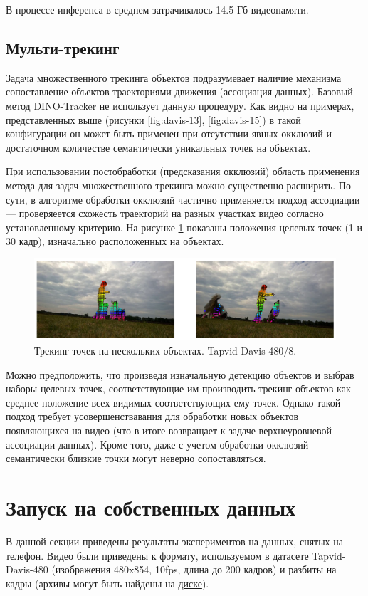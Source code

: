 \documentclass[a4paper, 14pt]{extarticle}
\theoremstyle{definition}
\theoremstyle{plain}
\theoremstyle{remark}
\begin{document}
В процессе инференса в среднем затрачивалось 14.5 Гб видеопамяти.

\subsection{Мульти-трекинг}
Задача множественного трекинга объектов подразумевает наличие механизма сопоставление объектов траекториями движения (ассоциация данных). Базовый метод DINO-Tracker не использует данную процедуру. Как видно на примерах, представленных выше (рисунки \ref{fig:davis-13}, \ref{fig:davis-15}) в такой конфигурации он может быть применен при отсутствии явных окклюзий и достаточном количестве семантически уникальных точек на объектах.

При использовании постобработки (предсказания окклюзий) область применения метода для задач множественного трекинга можно существенно расширить. По сути, в алгоритме обработки окклюзий частично применяется подход ассоциации --- проверяеется схожесть траекторий на разных участках видео согласно установленному критерию. На рисунке \ref{fig:davis-8} показаны положения целевых точек (1 и 30 кадр), изначально расположенных на объектах.
\begin{figure}
    [H]
    \centering
    \includegraphics[width=\textwidth]{figs/davis-8.png}
    \caption{Трекинг точек на нескольких объектах. Tapvid-Davis-480/8.}
    \label{fig:davis-8}
\end{figure}

Можно предположить, что произведя изначальную детекцию объектов и выбрав наборы целевых точек, соответствующие им производить трекинг объектов как среднее положение всех видимых соответствующих ему точек.
Однако такой подход требует усовершенствавания для обработки новых объектов появляющихся на видео (что в итоге возвращает к задаче верхнеуровневой ассоциации данных). Кроме того, даже с учетом обработки окклюзий семантически близкие точки могут неверно сопоставляться.
\newpage

\section{Запуск на собственных данных}
В данной секции приведены результаты экспериментов на данных, снятых на телефон. Видео были приведены к формату, используемом в датасете Tapvid-Davis-480 (изображения 480x854, 10fps, длина до 200 кадров) и разбиты на кадры (архивы могут быть найдены на \href{https://drive.google.com/drive/folders/1kL4srq3aIuJvA-0jlK886FdR1ZIgu8Ui?usp=drive_link}{диске}). 
\end{document}
